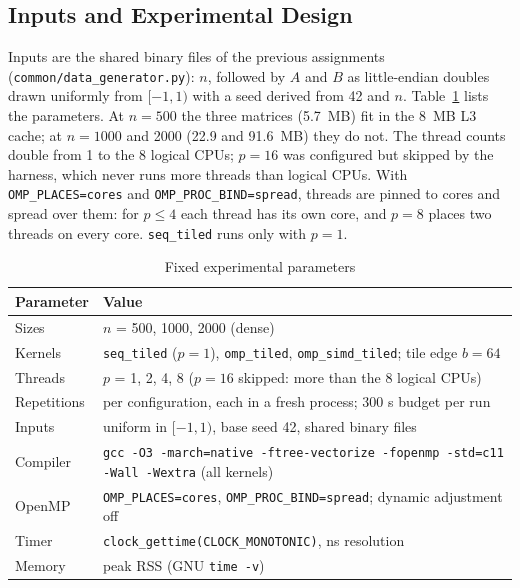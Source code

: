 \documentclass[conference,a4paper]{IEEEtran}
\newcommand{\code}[1]{\texttt{#1}}
\newcommand{\seqk}{\code{seq\_tiled}}
\newcommand{\ompk}{\code{omp\_tiled}}
\newcommand{\simdk}{\code{omp\_simd\_tiled}}
\begin{document}
\subsection{Inputs and Experimental Design}
\label{sec:design}
Inputs are the shared binary files of the previous assignments
(\code{common/\allowbreak data\_\allowbreak generator.py}): $n$, followed by
$A$ and $B$ as little-endian doubles drawn uniformly from $[-1, 1)$ with a seed
derived from 42 and $n$. Table~\ref{tab:parameters} lists the parameters. At
$n = 500$ the three matrices (5.7~MB) fit in the 8~MB L3 cache; at $n = 1000$
and 2000 (22.9 and 91.6~MB) they do not. The thread counts double from 1 to the
8 logical CPUs; $p = 16$ was configured but skipped by the harness, which never
runs more threads than logical CPUs. With \code{OMP\_PLACES=cores} and
\code{OMP\_PROC\_BIND=spread}, threads are pinned to cores and spread over
them: for $p \le 4$ each thread has its own core, and $p = 8$ places two
threads on every core. \seqk{} runs only with $p = 1$.

\begin{table}[t]
  \centering
  \caption{Fixed experimental parameters}
  \label{tab:parameters}
  \footnotesize
  \begin{tabular}{@{}l>{\raggedright\arraybackslash}p{}@{}}
    \toprule
    \textbf{Parameter} & \textbf{Value} \\
    \midrule
    Sizes       & $n$ = 500, 1000, 2000 (dense) \\
    Kernels     & \seqk{} ($p = 1$), \ompk, \simdk; tile edge $b = 64$ \\
    Threads     & $p$ = 1, 2, 4, 8 ($p = 16$ skipped: more than the 8 logical CPUs) \\
    Repetitions & 5 per configuration, each in a fresh process; 300 s budget per run \\
    Inputs      & uniform in $[-1,1)$, base seed 42, shared binary files \\
    Compiler    & \code{gcc -O3 -march=native -ftree-vectorize -fopenmp -std=c11 -Wall -Wextra}
                  (all kernels) \\
    OpenMP      & \code{OMP\_PLACES=cores}, \code{OMP\_PROC\_BIND=spread};
                  dynamic adjustment off \\
    Timer       & \code{clock\_gettime(CLOCK\_MONOTONIC)}, ns resolution \\
    Memory      & peak RSS (GNU \code{time -v}) \\
    \bottomrule
  \end{tabular}
\end{table}
\end{document}
